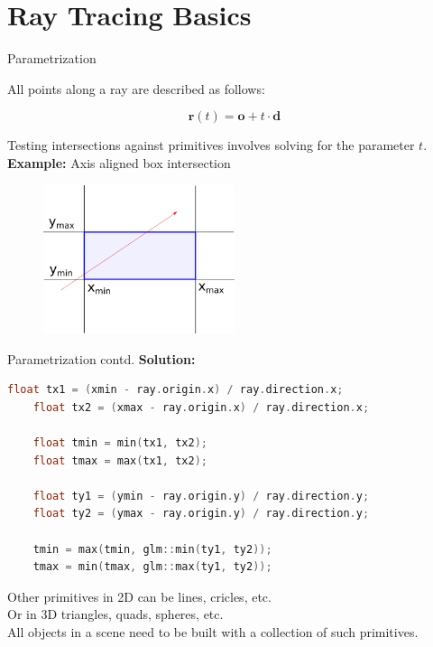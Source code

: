 \documentclass[aspectratio=43,t]{beamer}
\begin{document}
	\section{Ray Tracing Basics}
    \begin{frame}[fragile]{Parametrization}
		
		All points along a ray are described as follows:

		\begin{equation*}
			\boldsymbol{r}(t) = \boldsymbol{o} + t \cdot \boldsymbol{d}
		\end{equation*}

		Testing intersections against primitives involves solving for the parameter $t$.\\
		\textbf{Example:} Axis aligned box intersection\\
		
		\begin{figure}
		\centering
		\includegraphics[width=0.5\textwidth]{images/aabb.png}
		\end{figure}
    \end{frame}

    \begin{frame}[fragile]{Parametrization contd.}
			\textbf{Solution:} \\
			\bigskip
			
		\begin{lstlisting}[language=C++]
  	float tx1 = (xmin - ray.origin.x) / ray.direction.x;
  	float tx2 = (xmax - ray.origin.x) / ray.direction.x;

  	float tmin = min(tx1, tx2);
  	float tmax = max(tx1, tx2);

  	float ty1 = (ymin - ray.origin.y) / ray.direction.y;
  	float ty2 = (ymax - ray.origin.y) / ray.direction.y;

  	tmin = max(tmin, glm::min(ty1, ty2));
  	tmax = min(tmax, glm::max(ty1, ty2));
		\end{lstlisting}
		\bigskip
		Other primitives in 2D can be lines, cricles, etc.\\
		Or in 3D triangles, quads, spheres, etc.\\
		\bigskip
		All objects in a scene need to be built with a collection of such primitives.
    \end{frame}
\end{document}
